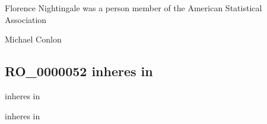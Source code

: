 \documentclass[letterpaper,10pt,english]{sphinxmanual}
\begin{document}
\begin{sphinxShadowBox}

\sphinxAtStartPar
{\hyperref[\detokenize{doc-NCBITaxon_9606::doc}]{}}
\end{sphinxShadowBox}

\begin{sphinxShadowBox}

\sphinxAtStartPar
{\hyperref[\detokenize{doc-ORG_0000001::doc}]{}}
\end{sphinxShadowBox}

\begin{sphinxShadowBox}

\sphinxAtStartPar
Florence Nightingale was a person member of the American Statistical Association
\end{sphinxShadowBox}

\begin{sphinxShadowBox}

\sphinxAtStartPar
Michael Conlon 
\end{sphinxShadowBox}
\begin{quote}

\ignorespaces \end{quote}


\subsection{RO\_0000052 \sphinxhyphen{} inheres in}
\label{\detokenize{doc-RO_0000052:ro-0000052-inheres-in}}\label{\detokenize{doc-RO_0000052:index-0}}\label{\detokenize{doc-RO_0000052::doc}}
\begin{sphinxShadowBox}

\sphinxAtStartPar
inheres in
\end{sphinxShadowBox}

\begin{sphinxShadowBox}

\sphinxAtStartPar
inheres in
\end{sphinxShadowBox}
\end{document}
